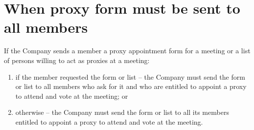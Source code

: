 \section{When proxy form must be sent to all members}

If the Company sends a member a proxy appointment form for a meeting or a list of persons willing to act as proxies at a meeting:

\begin{enumerate}[label=(\alph*)]
    \item if the member requested the form or list – the Company must send the form or list to all members who ask for it and who are entitled to appoint a proxy to attend and vote at the meeting; or
    
    \item otherwise – the Company must send the form or list to all its members entitled to appoint a proxy to attend and vote at the meeting.
\end{enumerate} 